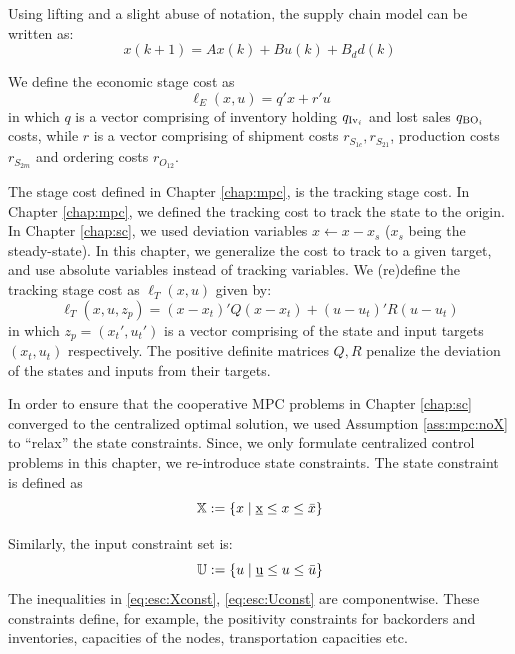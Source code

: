 Using lifting and a slight abuse of notation, the supply chain model
can be written as:
\begin{equation}
\label{eq:esc:model}
x(k+1) = Ax(k) + Bu(k) + B_dd(k)
\end{equation}

We define the economic stage cost as
\begin{equation}
\label{eq:esc:ellE}
\ell_E(x,u) = q'x + r'u
\end{equation}
in which $q$ is a vector comprising of inventory holding $q_{\textrm{Iv}_i}$
and lost sales $q_{\textrm{BO}_i}$ costs, while $r$ is a vector comprising of
shipment costs $r_{S_{1c}}, r_{S_{21}}$,
production costs $r_{S_{2m}}$ and ordering costs $r_{O_{12}}$.

The stage cost defined in Chapter \ref{chap:mpc}, is the tracking
stage cost. In Chapter \ref{chap:mpc}, we defined the tracking cost to
track the state to the origin. In Chapter \ref{chap:sc}, we used
deviation variables $x \leftarrow x-x_s$ ($x_s$ being the
steady-state). In this chapter, we generalize the cost to track to a 
given target, and use absolute variables instead of tracking
variables. We (re)define the tracking stage cost as $\ell_T(x,u)$
given by:
\begin{equation}
\label{eq:esc:ellT}
\ell_T(x,u,z_p) = (x-x_t)'Q(x-x_t)+(u-u_t)'R(u-u_t)
\end{equation}
in which $z_p = (x_t',u_t')$ is a vector comprising of the state and
input targets $(x_t,u_t)$ respectively. The positive definite matrices
$Q,R$ penalize the deviation of the states and inputs from their
targets.

In order to ensure that the cooperative MPC problems in Chapter
\ref{chap:sc} converged to the centralized optimal solution, we used
Assumption \ref{ass:mpc:noX} to ``relax'' the
state constraints. Since, we only formulate centralized control
problems in this chapter, we re-introduce state constraints. The state
constraint is defined as 
\begin{equation}
\label{eq:esc:Xconst}
\mathbb{X}:= \left\lbrace x \mid \underbar{x} \leq x \leq \bar{x} \right\rbrace
\end{equation}

Similarly, the input constraint set is:
\begin{equation}
\label{eq:esc:Uconst}
\mathbb{U}:= \left\lbrace u \mid \underbar{u} \leq u \leq \bar{u} \right\rbrace
\end{equation}
The inequalities in \eqref{eq:esc:Xconst}, \eqref{eq:esc:Uconst} are componentwise. These
constraints define, for example, the positivity constraints for
backorders and inventories, capacities of the nodes, transportation
capacities etc.

